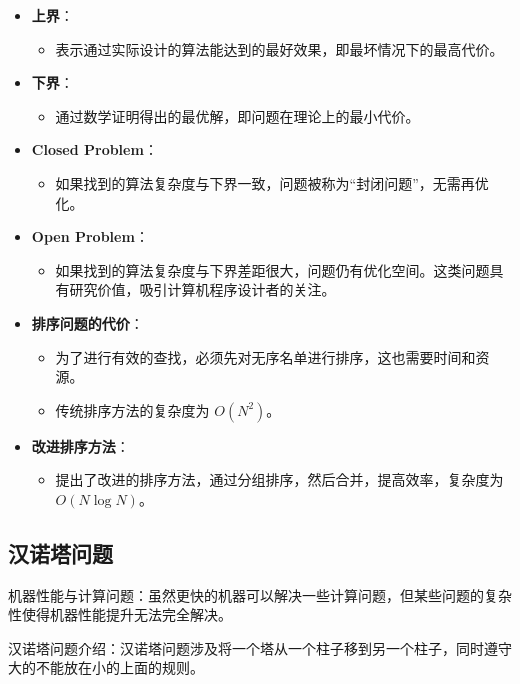\documentclass[UTF-8,a4paper,9pt]{article}
\begin{document}
\begin{itemize}
  \item \textbf{上界}：
        \begin{itemize}
          \item 表示通过实际设计的算法能达到的最好效果，即最坏情况下的最高代价。
        \end{itemize}
  \item \textbf{下界}：
        \begin{itemize}
          \item 通过数学证明得出的最优解，即问题在理论上的最小代价。
        \end{itemize}
  \item \textbf{Closed Problem}：
        \begin{itemize}
          \item 如果找到的算法复杂度与下界一致，问题被称为“封闭问题”，无需再优化。
        \end{itemize}
  \item \textbf{Open Problem}：
        \begin{itemize}
          \item 如果找到的算法复杂度与下界差距很大，问题仍有优化空间。这类问题具有研究价值，吸引计算机程序设计者的关注。
        \end{itemize}
  \item \textbf{排序问题的代价}：
        \begin{itemize}
          \item 为了进行有效的查找，必须先对无序名单进行排序，这也需要时间和资源。
          \item 传统排序方法的复杂度为 $O(N^2)$。
        \end{itemize}
  \item \textbf{改进排序方法}：
        \begin{itemize}
          \item 提出了改进的排序方法，通过分组排序，然后合并，提高效率，复杂度为 $O(N \log N)$。
        \end{itemize}
\end{itemize}

\subsection{汉诺塔问题}
机器性能与计算问题：虽然更快的机器可以解决一些计算问题，但某些问题的复杂性使得机器性能提升无法完全解决。

汉诺塔问题介绍：汉诺塔问题涉及将一个塔从一个柱子移到另一个柱子，同时遵守大的不能放在小的上面的规则。
\end{document}
